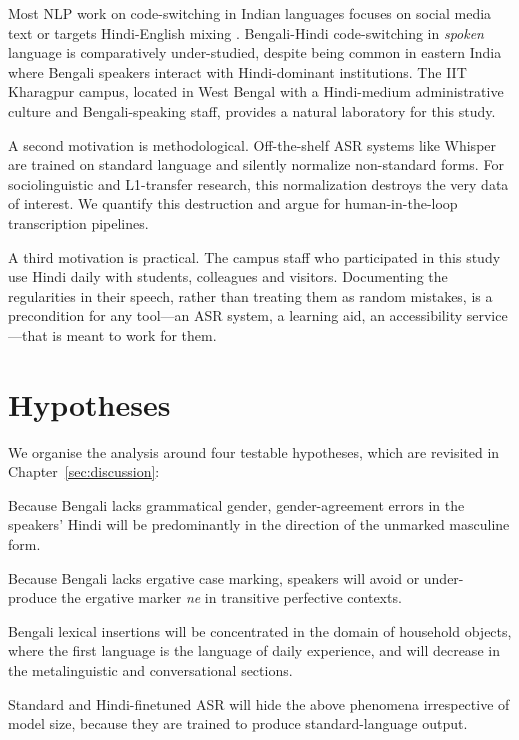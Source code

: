 \documentclass[11pt,a4paper]{report}
\begin{document}
Most NLP work on code-switching in Indian languages focuses on social media text \citep{bali2014borrowing} or targets Hindi-English mixing \citep{singh2018twitter}. Bengali-Hindi code-switching in \textit{spoken} language is comparatively under-studied, despite being common in eastern India where Bengali speakers interact with Hindi-dominant institutions. The IIT Kharagpur campus, located in West Bengal with a Hindi-medium administrative culture and Bengali-speaking staff, provides a natural laboratory for this study.

A second motivation is methodological. Off-the-shelf ASR systems like Whisper are trained on standard language and silently normalize non-standard forms. For sociolinguistic and L1-transfer research, this normalization destroys the very data of interest. We quantify this destruction and argue for human-in-the-loop transcription pipelines.

A third motivation is practical. The campus staff who participated in this study use Hindi daily with students, colleagues and visitors. Documenting the regularities in their speech, rather than treating them as random mistakes, is a precondition for any tool---an ASR system, a learning aid, an accessibility service---that is meant to work for them.

\section{Hypotheses}

We organise the analysis around four testable hypotheses, which are revisited in Chapter~\ref{sec:discussion}:

\begin{description}[leftmargin=2.2em, style=nextline]
  \item[H1 (Transfer)] Because Bengali lacks grammatical gender, gender-agreement errors in the speakers' Hindi will be predominantly in the direction of the unmarked masculine form.
  \item[H2 (Avoidance)] Because Bengali lacks ergative case marking, speakers will avoid or under-produce the ergative marker \textit{ne} in transitive perfective contexts.
  \item[H3 (Salience)] Bengali lexical insertions will be concentrated in the domain of household objects, where the first language is the language of daily experience, and will decrease in the metalinguistic and conversational sections.
  \item[H4 (Opacity)] Standard and Hindi-finetuned ASR will hide the above phenomena irrespective of model size, because they are trained to produce standard-language output.
\end{description}
\end{document}
